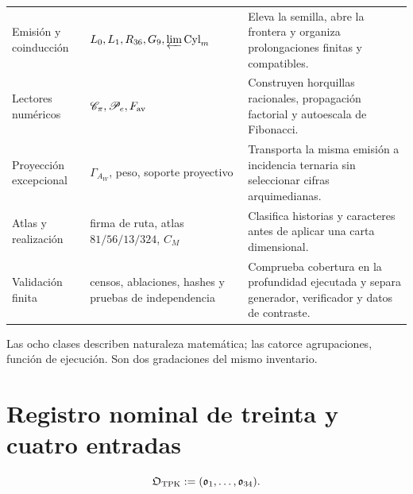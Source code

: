 \begin{longtable}{@{}p{}p{}p{}@{}}
Emisión y coinducción&
\(L_0,L_1,R_{36},G_9,\varprojlim\operatorname{Cyl}_m\)&
Eleva la semilla, abre la frontera y organiza prolongaciones finitas y
compatibles.\\

Lectores numéricos&
\(\mathscr C_\pi,\mathscr P_e,F_{\rm av}\)&
Construyen horquillas racionales, propagación factorial y autoescala de
Fibonacci.\\

Proyección excepcional&
\(\Gamma_{A_W}\), peso, soporte proyectivo&
Transporta la misma emisión a incidencia ternaria sin seleccionar cifras
arquimedianas.\\

Atlas y realización&
firma de ruta, atlas \(81/56/13/324\), \(C_M\)&
Clasifica historias y caracteres antes de aplicar una carta dimensional.\\

Validación finita&
censos, ablaciones, hashes y pruebas de independencia&
Comprueba cobertura en la profundidad ejecutada y separa generador,
verificador y datos de contraste.\\
\bottomrule
\end{longtable}
\endgroup

Las ocho clases describen naturaleza matemática; las catorce agrupaciones,
función de ejecución. Son dos gradaciones del mismo inventario.

\section{Registro nominal de treinta y cuatro entradas}

\begin{equation}
 \mathfrak O_{\rm TPK}:=(\mathfrak o_1,\ldots,\mathfrak o_{34}).
 \label{eq:u006f-registro-operadores}
\end{equation}

